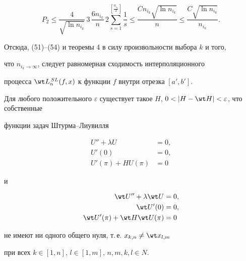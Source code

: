 \begin{pf}
$$ 


P_2\le\frac{4}{\sqrt{\ln n_{i_k}}}\,3\,\frac{6n_{i_k}}{n}\, 


2\sum^{[\frac{n_{i_k}}{2}]}_{s=1}\frac{1}{s}\le 


\frac{C n_{i_k}\sqrt{\ln n_{i_k}}}{n}\le 


\frac{C\sqrt{\ln n_{i_k}}}{n_{i_k}}. 


$$ 


Отсюда, (51)--(54) и теоремы 4 в силу произвольности выбора $k$ и того, 


что $n_{i_k\to\infty}$, следует равномерная сходимость интерполяционного 


процесса $\wt L^{\,SL}_n(f,x)$ к функции $f$ внутри отрезка $[a',b']$. 


\end{pf} 


 


\begin{lem} 


Для любого положительного $\varepsilon$ существует такое $H$, $0<|H-\wt 


H|<\varepsilon$, что собственные 


функции задач Штурма--Лиувилля 


\begin{equation} 


\begin{split} 


U''+\lambda U&=0,\\ 


U'(0)&=0, \\ 


U'(\pi)+H U(\pi)&=0 


\end{split} 


\end{equation} 


и 


\begin{equation} 


\begin{split} 


\wt U''+\lambda\wt U&=0, \\ 


\wt U'(0)&=0, \\ 


\wt U'(\pi)+\wt H\wt U(\pi)&=0 


\end{split} 


\end{equation} 


не имеют ни одного общего нуля, т.\,е. $x_{k,n}\ne\wt x_{l,m}$ 


при всех $k\in[1,n]$, $l\in[1,m]$, $n,m,k,l\in N$. 


\end{lem} 


